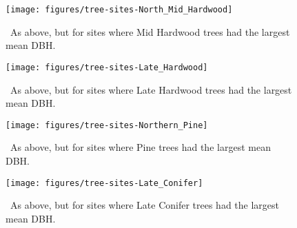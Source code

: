\clearpage

\begin{figure}[ht]
  \centering
  \texttt{[image: figures/tree-sites-North\_Mid\_Hardwood]}
  \caption{\label{fig:tree-sites-MH}\
    As above, but for sites where Mid Hardwood trees had the largest mean DBH.
  }
\end{figure}

\clearpage

\begin{figure}[ht]
  \centering
  \texttt{[image: figures/tree-sites-Late\_Hardwood]}
  \caption{\label{fig:tree-sites-LH}\
    As above, but for sites where Late Hardwood trees had the largest mean DBH.
  }
\end{figure}

\clearpage

\begin{figure}[ht]
  \centering
  \texttt{[image: figures/tree-sites-Northern\_Pine]}
  \caption{\label{fig:tree-sites-P}\
    As above, but for sites where Pine trees had the largest mean DBH.
  }
\end{figure}

\clearpage

\begin{figure}[ht]
  \centering
  \texttt{[image: figures/tree-sites-Late\_Conifer]}
  \caption{\label{fig:tree-sites-LC}\
    As above, but for sites where Late Conifer trees had the largest mean DBH.
  }
\end{figure}
